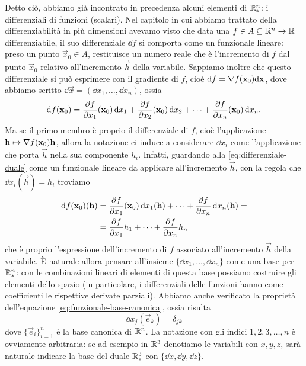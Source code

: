 Detto ciò, abbiamo già incontrato in precedenza alcuni elementi di $\mathbb{R}^n_*$: i differenziali di funzioni (scalari).
Nel capitolo in cui abbiamo trattato della differenziabilità in più dimensioni avevamo visto che data una $f\in A\subseteq\mathbb{R}^n\to\mathbb{R}$ differenziabile, il suo differenziale $\dd f$ si comporta come un funzionale lineare: preso un punto $\vec x_0\in A$, restituisce un numero reale che è l'incremento di $f$ dal punto $\vec x_0$ relativo all'incremento $\vec h$ della variabile.
Sappiamo inoltre che questo differenziale si può esprimere con il gradiente di $f$, cioè $\textup{d} f=\nabla f(\mathbf{x}_0)\textup{d}\mathbf{x}$, dove abbiamo scritto $\dd\vec x=(\dd x_1,\dots,\dd x_n)$, ossia
\begin{equation}
	\textup{d} f(\mathbf{x}_0)=\frac{\partial {f}}{\partial {x_1}}(\mathbf{x}_0)\,\textup{d} x_1+\frac{\partial {f}}{\partial {x_2}}(\mathbf{x}_0)\,\textup{d} x_2+\dots+\frac{\partial {f}}{\partial {x_n}}(\mathbf{x}_0)\,\textup{d} x_n.
	\label{eq:differenziale-duale}
\end{equation}
Ma se il primo membro è proprio il differenziale di $f$, cioè l'applicazione $\mathbf{h}\mapsto\nabla f(\mathbf{x}_0)\mathbf{h}$, allora la notazione ci induce a considerare $\dd x_i$ come l'applicazione che porta $\vec h$ nella sua componente $h_i$.
Infatti, guardando alla \eqref{eq:differenziale-duale} come un funzionale lineare da applicare all'incremento $\vec h$, con la regola che $\dd x_i(\vec h)=h_i$ troviamo
\begin{equation}
	\begin{split}
		\textup{d} f(\mathbf{x}_0)(\mathbf{h})&=\frac{\partial {f}}{\partial {x_1}}(\mathbf{x}_0)\,\textup{d} x_1(\mathbf{h})+\dots+\frac{\partial {f}}{\partial {x_n}}\,\textup{d} x_n(\mathbf{h})=\\
		&=\frac{\partial {f}}{\partial {x_1}}h_1+\dots+\frac{\partial {f}}{\partial {x_n}}h_n
	\end{split}
\end{equation}
che è proprio l'espressione dell'incremento di $f$ associato all'incremento $\vec h$ della variabile.
È naturale allora pensare all'insieme $\{\dd x_1,\dots,\dd x_n\}$ come una base per $\mathbb{R}^n_*$: con le combinazioni lineari di elementi di questa base possiamo costruire gli elementi dello spazio (in particolare, i differenziali delle funzioni hanno come coefficienti le rispettive derivate parziali).
Abbiamo anche verificato la proprietà dell'equazione \eqref{eq:funzionale-base-canonica}, ossia risulta
\begin{equation}
	\dd x_j(\vec e_k)=\delta_{jk}
\end{equation}
dove $\{\vec e_i\}_{i=1}^n$ è la base canonica di $\mathbb{R}^n$.
La notazione con gli indici $1,2,3,\dots,n$ è ovviamente arbitraria: se ad esempio in $\mathbb{R}^3$ denotiamo le variabili con $x,y,z$, sarà naturale indicare la base del duale $\mathbb{R}^3_*$ con $\{\dd x,\dd y,\dd z\}$.


